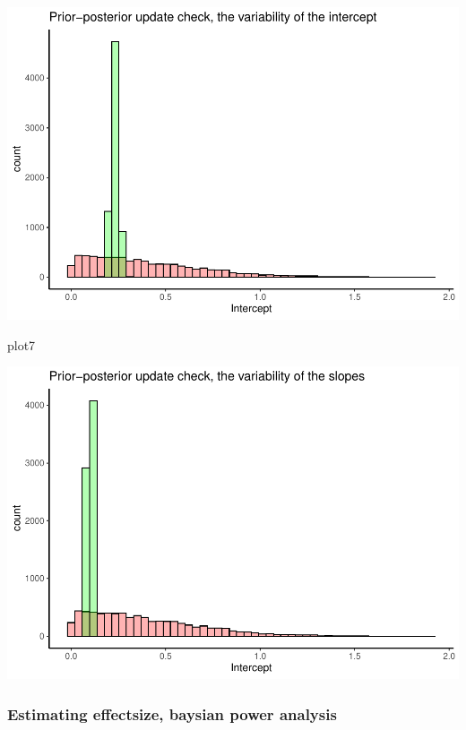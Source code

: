 \documentclass[
]{article}
\newenvironment{Shaded}{\begin{snugshade}}{\end{snugshade}}
\newcommand{\NormalTok}[1]{#1}
\begin{document}
\includegraphics{assignment_1_final_files/figure-latex/unnamed-chunk-14-6.pdf}

\begin{Shaded}
\begin{Highlighting}[]
\NormalTok{plot7}
\end{Highlighting}
\end{Shaded}

\includegraphics{assignment_1_final_files/figure-latex/unnamed-chunk-14-7.pdf}

\hypertarget{estimating-effectsize-baysian-power-analysis}{%
\subsubsection{Estimating effectsize, baysian power
analysis}\label{estimating-effectsize-baysian-power-analysis}}
\end{document}
